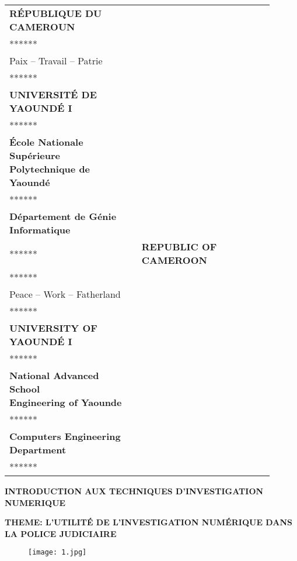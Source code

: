 \documentclass[12pt,a4paper]{article}
\begin{document}
\begin{titlepage}
    \centering

\begin{tabular}{p{0.45\linewidth} p{0.45\linewidth}}
\centering
\textbf{RÉPUBLIQUE DU CAMEROUN}\\
******\\
Paix -- Travail -- Patrie\\
******\\
\textbf{UNIVERSITÉ DE YAOUNDÉ I}\\
******\\
\textbf {École Nationale Supérieure\\
Polytechnique de Yaoundé}\\
******\\
\textbf {Département de Génie Informatique}\\
****** &
\centering
\textbf{REPUBLIC OF CAMEROON}\\
******\\
Peace -- Work -- Fatherland\\
******\\
\textbf{UNIVERSITY OF YAOUNDÉ I}\\
******\\
\textbf {National Advanced School\\
Engineering of Yaounde}\\
******\\
\textbf {Computers Engineering Department}\\
****** \\
\end{tabular}
\vspace{1 cm}

    \begin{LARGE}

    \textbf{INTRODUCTION AUX TECHNIQUES D'INVESTIGATION NUMERIQUE}
    \end{LARGE}

    \vspace{1cm}

    \begin{Large}
    \textbf{THEME: L'UTILITÉ DE L'INVESTIGATION NUMÉRIQUE DANS LA POLICE JUDICIAIRE}
    \end{Large}
    
    \vspace{1cm}
    
    \begin{figure}[h]
    \centering
    \texttt{[image: 1.jpg]}
	\end{figure}
	

\end{titlepage}
\end{document}
